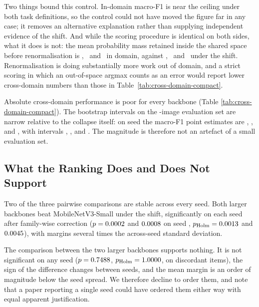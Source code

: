 \documentclass[runningheads]{llncs}
\begin{document}
Two things bound this control. In-domain macro-F1 is near the ceiling under both
task definitions, so the control could not have moved the figure far in any
case; it removes an alternative explanation rather than supplying independent
evidence of the shift. And while the scoring procedure is identical on both
sides, what it does is not: the mean probability mass retained inside the shared
space before renormalisation is \RetainedMassPvInSharedRn,
\RetainedMassPvInSharedEb\ and \RetainedMassPvInSharedMn\ in domain, against
\RetainedMassRn, \RetainedMassEb\ and \RetainedMassMn\ under the shift.
Renormalisation is doing substantially more work out of domain, and a strict
scoring in which an out-of-space argmax counts as an error would report lower
cross-domain numbers than those in Table~\ref{tab:cross-domain-compact}.

Absolute cross-domain performance is poor for every backbone (Table
\ref{tab:cross-domain-compact}). The bootstrap intervals on the
\NXdImages{}-image evaluation set are narrow relative to the collapse itself: on
seed \SigSeed{} the macro-F1 point estimates are \MacroFXdRnS{},
\MacroFXdEbS{}, and \MacroFXdMnS{}, with intervals \CiFXdRn{}, \CiFXdEb{}, and
\CiFXdMn{}. The magnitude is therefore not an artefact of a small evaluation
set.



\subsection{What the Ranking Does and Does Not Support}

Two of the three pairwise comparisons are stable across every seed. Both larger
backbones beat MobileNetV3-Small under the shift, significantly on each seed
after family-wise correction ($p = 0.0002{}$ and $0.0008{}$ on seed
\SigSeed{}, $p_{\mathrm{Holm}} = 0.0013{}$ and $0.0045{}$), with
margins several times the across-seed standard deviation.

The comparison between the two larger backbones supports nothing. It is not
significant on any seed ($p = 0.7488{}$, $p_{\mathrm{Holm}} =
1.0000{}$, on \NDiscXdRnEb{} discordant items), the sign of the
difference changes between seeds, and the mean margin is an order of magnitude
below the seed spread. We therefore decline to order them, and note that a paper
reporting a single seed could have ordered them either way with equal apparent
justification.
\end{document}
